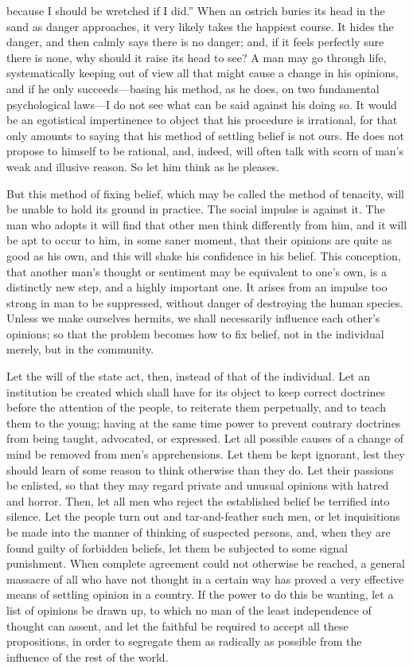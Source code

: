 because I should be wretched if I did.'' When an ostrich buries its
head in the sand as danger approaches, it very likely takes the
happiest course. It hides the danger, and then calmly says there is no
danger; and, if it feels perfectly sure there is none, why should it
raise its head to see? A man may go through life, systematically
keeping out of view all that might cause a change in his opinions, and
if he only suc\-ceeds---basing his method, as he does, on two
fundamental psychological laws---I do not see what can be said against
his doing so. It would be an egotistical impertinence to object that
his procedure is irrational, for that only amounts to saying that his
method of settling belief is not ours. He does not propose to himself
to be rational, and, indeed, will often talk with scorn of man's weak
and illusive reason. So let him think as he pleases.

But this method of fixing belief, which may be called the method of
tenacity, will be unable to hold its ground in practice. The social
impulse is against it. The man who adopts it will find that other men
think differently from him, and it will be apt to occur to him, in
some saner moment, that their opinions are quite as good as his own,
and this will shake his confidence in his belief. This conception,
that another man's thought or sentiment may be equivalent to one's
own, is a distinctly new step, and a highly important one. It arises
from an impulse too strong in man to be suppressed, without danger of
destroying the human species. Unless we make ourselves hermits, we
shall necessarily influence each other's opinions; so that the problem
becomes how to fix belief, not in the individual merely, but in the
community.

Let the will of the state act, then, instead of that of the
individual. Let an institution be created which shall have for its
object to keep correct doctrines before the attention of the people,
to reiterate them perpetually, and to teach them to the young; having
at the same time power to prevent contrary doctrines from being
taught, advocated, or expressed. Let all possible causes of a change
of mind be removed from men's apprehensions. Let them be kept
ignorant, lest they should learn of some reason to think otherwise
than they do. Let their passions be enlisted, so that they may regard
private and unusual opinions with hatred and horror. Then, let all men
who reject the established belief be terrified into silence. Let the
people turn out and tar-and-feather such men, or let inquisitions be
made into the manner of thinking of suspected persons, and, when they
are found guilty of forbidden beliefs, let them be subjected to some
signal punishment. When complete agreement could not otherwise be
reached, a general massacre of all who have not thought in a certain
way has proved a very effective means of settling opinion in a
country. If the power to do this be wanting, let a list of opinions be
drawn up, to which no man of the least independence of thought can
 assent, and let the faithful be required to accept all these
propositions, in order to segregate them as radically as possible from
the influence of the rest of the world.

